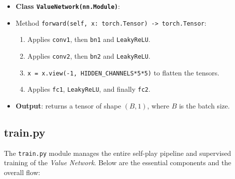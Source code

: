 \documentclass{report}
\begin{document}
\begin{itemize}
  \item \textbf{Class \texttt{ValueNetwork(nn.Module)}}:
      \item Method \texttt{forward(self, x: torch.Tensor) -> torch.Tensor}:
        \begin{enumerate}
          \item Applies \texttt{conv1}, then \texttt{bn1} and \texttt{LeakyReLU}.
          \item Applies \texttt{conv2}, then \texttt{bn2} and \texttt{LeakyReLU}.
          \item \texttt{x = x.view(-1, HIDDEN\_CHANNELS*5*5)} to flatten the tensors.
          \item Applies \texttt{fc1}, \texttt{LeakyReLU}, and finally \texttt{fc2}.
        \end{enumerate}
      \item \textbf{Output}: returns a tensor of shape \((B,1)\), where \(B\) is the batch size.  
    \end{itemize}

\subsection{train.py}
\label{sec:train_py}
The \texttt{train.py} module manages the entire self-play pipeline and supervised training of the \textit{Value Network}. Below are the essential components and the overall flow:
\end{document}
